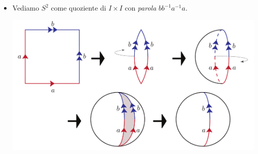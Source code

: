 \begin{examples}
\begin{itemize}
\begin{center}
		\end{center}
		\item Vediamo $S^2$ come quoziente di $I\times I$ con \textit{parola} $bb^{-1}a^{-1}a$.
		\begin{center}
			\includegraphics[trim=0cm 0cm 0cm 0cm, clip, scale=0.4]{images/sphere.pdf}
		\end{center}
	\end{itemize}
\end{examples}

